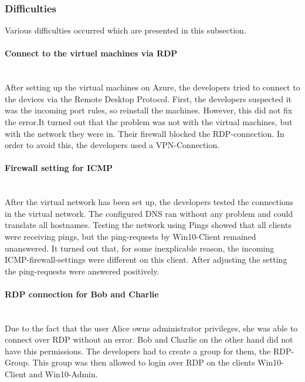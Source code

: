 \subsubsection{Difficulties}
Various difficulties occurred which are presented in this subsection.
\paragraph{Connect to the virtuel machines via RDP} \ \\
After setting up the virtual machines on Azure, the developers tried to connect to the devices via  the Remote Desktop Protocol. First, the developers suspected it was the incoming port rules, so reinstall the machines. However, this did not fix the error.It turned out that the problem was not with the virtual machines, but with the network they were in. Their firewall blocked the RDP-connection. In order to avoid this, the developers used a VPN-Connection.
\paragraph{Firewall setting for ICMP}\ \\
After the virtual network has been set up, the developers tested the connections in the virtual network. The configured DNS ran without any problem and could translate all hostnames. Testing the network using Pings showed that all clients were receiving pings, but the ping-requests by Win10-Client remained unanswered. It turned out that,  for some inexplicable reason, the incoming ICMP-firewall-settings were different on this client. After adjusting the setting the ping-requests were answered positively.

\paragraph{RDP connection for Bob and Charlie}\ \\
Due to the fact that the user Alice owns administrator privileges, she was able to connect over RDP without an error. Bob and Charlie on the other hand did not have this permissions. The developers had to create a group for them, the RDP-Group. This group was then allowed to login over RDP on the clients Win10-Client and Win10-Admin. 
